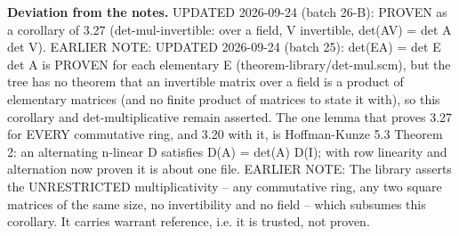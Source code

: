 %
\noindent\textbf{Deviation from the notes.} UPDATED 2026-09-24 (batch 26-B): PROVEN as a corollary of 3.27 (det-mul-invertible: over a field, V invertible, det(AV) = det A det V). EARLIER NOTE: UPDATED 2026-09-24 (batch 25): det(EA) = det E det A is PROVEN for each elementary E (theorem-library/det-mul.scm), but the tree has no theorem that an invertible matrix over a field is a product of elementary matrices (and no finite product of matrices to state it with), so this corollary and det-multiplicative remain asserted. The one lemma that proves 3.27 for EVERY commutative ring, and 3.20 with it, is Hoffman-Kunze 5.3 Theorem 2: an alternating n-linear D satisfies D(A) = det(A) D(I); with row linearity and alternation now proven it is about one file. EARLIER NOTE: The library asserts the UNRESTRICTED multiplicativity -- any commutative ring, any two square matrices of the same size, no invertibility and no field -- which subsumes this corollary.  It carries warrant reference, i.e. it is trusted, not proven.
%
\renewcommand{\thethm}{3.22}
